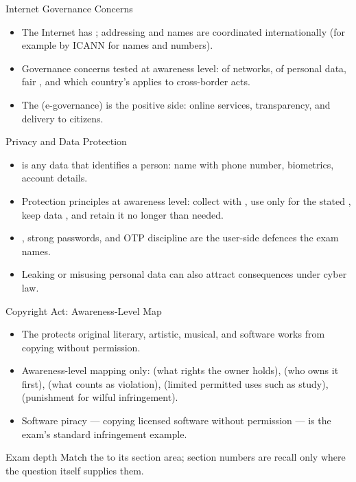 \documentclass[aspectratio=169]{beamer}
\begin{document}
\begin{frame}{Internet Governance Concerns}
  \begin{itemize}
    \item The Internet has ; addressing and names are
      coordinated internationally (for example by ICANN for names and numbers).
    \item Governance concerns tested at awareness level:  of
      networks,  of personal data, fair , and which
      country's  applies to cross-border acts.
    \item The  (e-governance) is the positive
      side: online services, transparency, and delivery to citizens.
  \end{itemize}
\end{frame}

\begin{frame}{Privacy and Data Protection}
  \begin{itemize}
    \item {} is any data that identifies a person: name with
      phone number, biometrics, account details.
    \item Protection principles at awareness level: collect with
      , use only for the stated , keep data
      , and retain it no longer than needed.
    \item {}, strong passwords, and OTP discipline are the
      user-side defences the exam names.
    \item Leaking or misusing personal data can also attract 
      consequences under cyber law.
  \end{itemize}
\end{frame}

\begin{frame}{Copyright Act: Awareness-Level Map}
  \begin{itemize}
    \item The  protects original literary, artistic,
      musical, and software works from copying without permission.
    \item Awareness-level mapping only:  (what rights
      the owner holds),  (who owns it first),
       (what counts as violation), 
      (limited permitted uses such as study),  (punishment for
      wilful infringement).
    \item Software piracy --- copying licensed software without permission ---
      is the exam's standard infringement example.
  \end{itemize}
  \begin{block}{Exam depth}
    Match the  to its section area; section numbers are recall
    only where the question itself supplies them.
  \end{block}
\end{frame}
\end{document}
